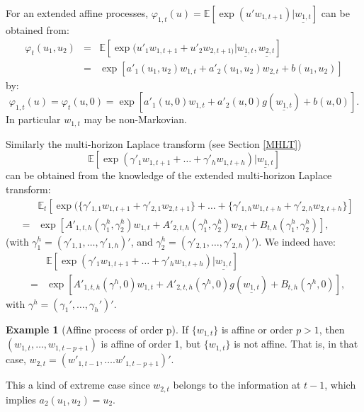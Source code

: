 \documentclass[
  12pt,
]{book}
\theoremstyle{definition}
\theoremstyle{definition}
\newtheorem{example}{Example}[chapter]
\theoremstyle{definition}
\theoremstyle{definition}
\theoremstyle{remark}
\begin{document}
For an extended affine processes, \(\varphi_{1,t}(u) = \mathbb{E}[\exp(u'w_{1,t+1})|\underline{w_{1,t}}]\) can be obtained from:
\begin{eqnarray*}
\varphi_t(u_1, u_2) &=& \mathbb{E}[\exp(u'_1w_{1,t+1}+u'_2 w_{2,t+1)}|\underline{w_{1,t}}, \underline{w_{2,t}}] \\
&=& \exp[a'_1(u_1,u_2)w_{1,t} + a'_2(u_1,u_2)w_{2,t}+b(u_1,u_2)]
\end{eqnarray*}
by:
\[
\varphi_{1,t}(u) = \varphi_t(u, 0) = \exp[a'_1(u,0)w_{1,t}+a'_2(u,0)g(\underline{w_{1,t}}) + b(u, 0)].
\]
In particular \(w_{1,t}\) may be non-Markovian.

Similarly the multi-horizon Laplace transform (see Section \ref{MHLT})
\[
\mathbb{E}[\exp(\gamma'_{1}w_{1,t+1}+\dots+\gamma'_{h}w_{1,t+h})|\underline{w_{1,t}}]
\]
can be obtained from the knowledge of the extended multi-horizon Laplace transform:
\begin{eqnarray*}
&&\mathbb{E}_t[\exp(\{\gamma'_{1,1}w_{1,t+1}+\gamma'_{2,1}w_{2,t+1}\}+\dots+ \{\gamma'_{1,h}w_{1,t+h}+\gamma'_{2,h}w_{2,t+h}\}] \\
&=& \exp[A'_{1,t,h}(\gamma^h_1, \gamma^h_2)w_{1,t}+A'_{2,t,h}(\gamma^h_1, \gamma^h_2)w_{2,t}+B_{t,h}(\gamma^h_1, \gamma^h_2)],
\end{eqnarray*}
(with \(\gamma^h_1 = (\gamma'_{1,1},\dots, \gamma'_{1,h})'\), and \(\gamma^h_2 = (\gamma'_{2,1},\dots, \gamma'_{2,h})'\)). We indeed have:
\begin{eqnarray*}
&& \mathbb{E}[\exp(\gamma'_{1}w_{1,t+1}+\dots+\gamma'_{h}w_{1,t+h})|\underline{w_{1,t}}]\\
&=& \exp[A'_{1,t,h}(\gamma^h,0) w_{1,t} + A'_{2,t,h}(\gamma^h,0)g (\underline{w_{1,t}}) + B_{t,h}(\gamma^h,0)],
\end{eqnarray*}
with \(\gamma^h = (\gamma_1',\dots,\gamma_h')'\).

\begin{example}[Affine process of order p]
\protect\hypertarget{exm:AffProcessOrderp}{}\label{exm:AffProcessOrderp}If \(\{w_{1,t}\}\) is affine or order \(p>1\), then \((w_{1,t},\dots,w_{1,t-p+1})\) is affine of order 1, but \(\{w_{1,t}\}\) is not affine. That is, in that case, \(w_{2,t} = (w'_{1,t-1}, \dots.w'_{1,t-p+1})'\).

This a kind of extreme case since \(w_{2,t}\) belongs to the information at \(t-1\), which implies \(a_2(u_1, u_2) = u_2\).
\end{example}
\end{document}
